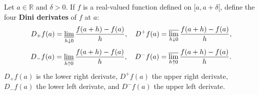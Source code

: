 Let $a \in \mathbb{R}$ and $\delta > 0$. If $f$ is a real-valued function defined on $[a, a+\delta[$, define the four \textbf{Dini derivates} of $f$ at $a$:
$$D_+ f(a) = \varliminf_{h \downarrow 0} \frac{f(a+h) - f(a)}{h}, \quad D^+ f(a) = \varlimsup_{h \downarrow 0} \frac{f(a+h) - f(a)}{h},$$
$$D_- f(a) = \varliminf_{h \uparrow 0} \frac{f(a+h) - f(a)}{h}, \quad D^- f(a) = \varlimsup_{h \uparrow 0} \frac{f(a+h) - f(a)}{h}.$$
$D_+ f(a)$ is the lower right derivate, $D^+ f(a)$ the upper right derivate, $D_- f(a)$ the lower left derivate, and $D^- f(a)$ the upper left derivate.
